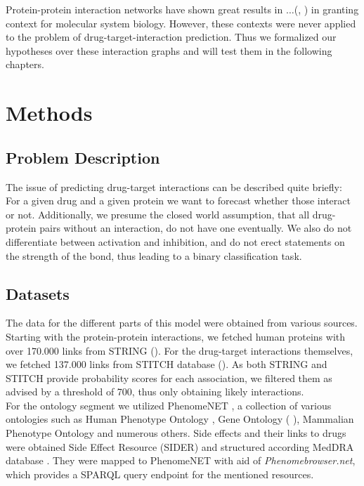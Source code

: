 \documentclass{bioinfo}
\renewcommand{\cite}{\citep}
\begin{document}
Protein-protein interaction networks have shown great results in $\dots$(\cite{Vazquez2003}, \cite{Ackerman2019}) in granting context for molecular system biology. However, these contexts were never applied to the problem of drug-target-interaction prediction. Thus we formalized our hypotheses over these interaction graphs and will test them in the following chapters.

\enlargethispage{12pt}

\section{Methods}
\subsection{Problem Description}
The issue of predicting drug-target interactions can be described quite briefly: For a given drug and a given protein we want to forecast whether those interact or not. Additionally, we presume the closed world assumption, that all drug-protein pairs without an interaction, do not have one eventually. We also do not differentiate between activation and inhibition, and do not erect statements on the strength of the bond, thus leading to a binary classification task.\\

\subsection{Datasets}
The data for the different parts of this model were obtained from various sources. Starting with the protein-protein interactions, we fetched  human proteins with over 170.000 links from STRING (\cite{STRINGv10}). For the drug-target interactions themselves, we fetched 
137.000 links from STITCH database (\cite{STITCHv5}). As both STRING and STITCH provide probability scores for each association, we filtered them as advised by a threshold of 700, thus only obtaining likely interactions.\\
For the ontology segment we utilized PhenomeNET \citep{PhenomeNET2011}, a collection of various ontologies such as Human Phenotype Ontology \citep{HPO2018}, Gene Ontology (\citet{GOoriginal2000} \citet{GOrecent2020}), Mammalian Phenotype Ontology \citep{MP2009} and numerous others. 
Side effects and their links to drugs were obtained Side Effect Resource (SIDER)\citep{SIDER} and structured according MedDRA database \citep{MedDRA}. They were mapped to PhenomeNET with aid of \textit{Phenomebrowser.net}, which provides a SPARQL query endpoint for the mentioned resources. \\
\end{document}
